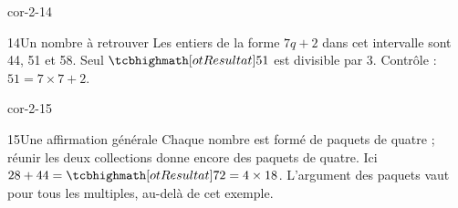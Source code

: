 \begin{blocLivre}{cor-2-14}\begin{corrige}{14}{Un nombre à retrouver}
Les entiers de la forme $7q+2$ dans cet intervalle sont 44, 51 et 58. Seul $\res{51}$ est divisible par 3. Contrôle : $51=7\times7+2$.
\end{corrige}\end{blocLivre}
\begin{blocLivre}{cor-2-15}\begin{corrige}{15}{Une affirmation générale}
Chaque nombre est formé de paquets de quatre ; réunir les deux collections donne encore des paquets de quatre. Ici $28+44=\res{72=4\times18}$. L’argument des paquets vaut pour tous les multiples, au-delà de cet exemple.
\end{corrige}\end{blocLivre}
